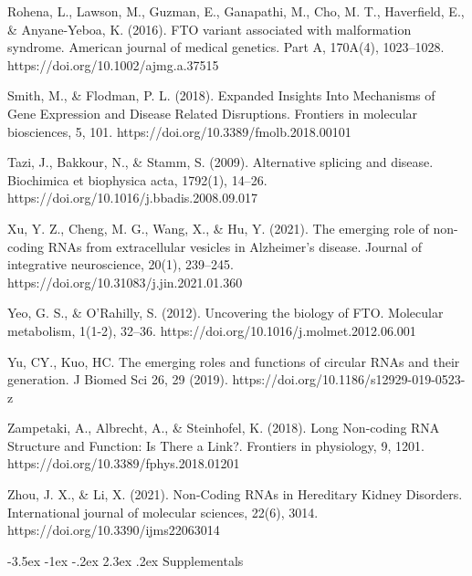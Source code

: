 \documentclass[11pt]{article}
\makeatletter
\renewcommand\section{\@startsection {section}{1}{\z@}%
                                       {-3.5ex \@plus -1ex \@minus -.2ex}%
                                       {2.3ex \@plus.2ex}%
                                       {\normalfont\fontfamily{phv}\fontsize{16}{19}\bfseries}}
\makeatother
\begin{document}
Rohena, L., Lawson, M., Guzman, E., Ganapathi, M., Cho, M. T., Haverfield, E., & Anyane-Yeboa, K. (2016). FTO variant associated with malformation syndrome. American journal of medical genetics. Part A, 170A(4), 1023–1028. https://doi.org/10.1002/ajmg.a.37515 

Smith, M., & Flodman, P. L. (2018). Expanded Insights Into Mechanisms of Gene Expression and Disease Related Disruptions. Frontiers in molecular biosciences, 5, 101. https://doi.org/10.3389/fmolb.2018.00101 

Tazi, J., Bakkour, N., & Stamm, S. (2009). Alternative splicing and disease. Biochimica et biophysica acta, 1792(1), 14–26. https://doi.org/10.1016/j.bbadis.2008.09.017 

Xu, Y. Z., Cheng, M. G., Wang, X., & Hu, Y. (2021). The emerging role of non-coding RNAs from extracellular vesicles in Alzheimer's disease. Journal of integrative neuroscience, 20(1), 239–245. https://doi.org/10.31083/j.jin.2021.01.360 

Yeo, G. S., & O'Rahilly, S. (2012). Uncovering the biology of FTO. Molecular metabolism, 1(1-2), 32–36. https://doi.org/10.1016/j.molmet.2012.06.001 

Yu, CY., Kuo, HC. The emerging roles and functions of circular RNAs and their generation. J Biomed Sci 26, 29 (2019). https://doi.org/10.1186/s12929-019-0523-z 

Zampetaki, A., Albrecht, A., & Steinhofel, K. (2018). Long Non-coding RNA Structure and Function: Is There a Link?. Frontiers in physiology, 9, 1201. https://doi.org/10.3389/fphys.2018.01201 

Zhou, J. X., & Li, X. (2021). Non-Coding RNAs in Hereditary Kidney Disorders. International journal of molecular sciences, 22(6), 3014. https://doi.org/10.3390/ijms22063014 

 



\section{Supplementals} \label{s:supplementals}

\end{document}
